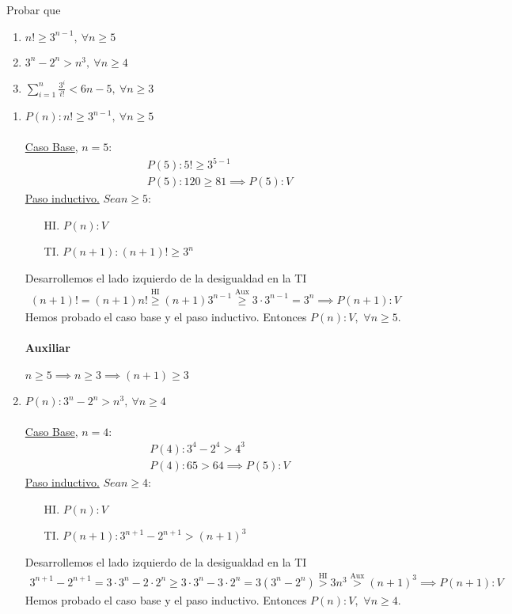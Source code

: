 \begin{enunciado}{\ejercicio}
Probar que
\begin{enumerate}[label=\roman*)]
	\item $n! \geq 3^{n-1}, \ \forall n \geq 5$
	\item $3^n - 2^n > n^3, \ \forall n \geq 4$
	\item $\displaystyle \sum_{i=1}^{n}\frac{3^i}{i!} < 6n - 5, \ \forall n \geq 3$
\end{enumerate}
\end{enunciado}
\begin{enumerate}[label=\roman*)]
	\item $P(n): n! \geq 3^{n-1}, \ \forall n \geq 5$ \\ \\
  \underline{Caso Base}, $n = 5$:
	\begin{align*}
		&P(5): 5! \geq 3^{5-1} \\
		&P(5): 120 \geq 81 \implies P(5):V
	\end{align*}
	\underline{Paso inductivo.} $Sea n \geq 5$:
	\begin{enumerate}
    \item[HI.] $P(n): V$
    \item[TI.] $P(n+1): (n+1)! \geq 3^n$
  \end{enumerate}
 	Desarrollemos el lado izquierdo de la desigualdad en la TI
  \begin{align*}
  	(n+1)! = (n+1)n! \overset{\text{HI}}{\geq} (n+1)3^{n-1} \overset{\text{Aux}}{\geq} 3 \cdot 3^{n-1} = 3^n
  	\implies P(n+1):V
  \end{align*}
  Hemos probado el caso base y el paso inductivo. Entonces $P(n):V,$ $\forall n \geq 5$.

  \paragraph{Auxiliar}{$n \geq 5 \implies n \geq 3 \implies (n+1) \geq 3$}

	\item $P(n): 3^n - 2^n > n^3, \ \forall n \geq 4$ \\ \\
	\underline{Caso Base}, $n = 4$:
	\begin{align*}
		&P(4): 3^4 - 2^4 > 4^3 \\
		&P(4): 65 > 64 \implies P(5):V
	\end{align*}
	\underline{Paso inductivo.} $Sea n \geq 4$:
	\begin{enumerate}
    \item[HI.] $P(n): V$
    \item[TI.] $P(n+1): 3^{n+1} - 2^{n+1} > (n+1)^3$
  \end{enumerate}
 	Desarrollemos el lado izquierdo de la desigualdad en la TI
  \begin{align*}
  	3^{n+1} - 2^{n+1} = 3 \cdot 3^n - 2 \cdot 2^n \geq 3 \cdot 3^n - 3 \cdot 2^n = 3(3^n - 2^n) 
  	\overset{\text{HI}}{>} 3n^3 \overset{\text{Aux}}{>} (n+1)^3 \implies P(n+1):V
  \end{align*}
  Hemos probado el caso base y el paso inductivo. Entonces $P(n):V,$ $\forall n \geq 4$.


\end{enumerate}
